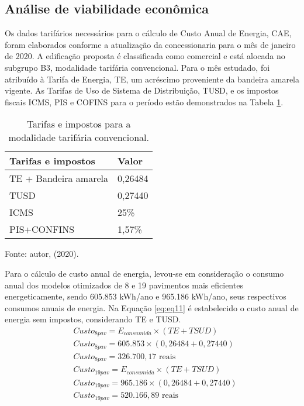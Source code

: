 \subsection{Análise de viabilidade econômica}
\noindent Os dados tarifários necessários para o cálculo de Custo Anual de Energia, CAE, foram elaborados conforme a atualização da concessionaria para o mês de janeiro de 2020. A edificação proposta é classificada como comercial e está alocada no subgrupo B3, modalidade tarifária convencional. Para o mês estudado, foi atribuído à Tarifa de Energia, TE, um acréscimo proveniente da bandeira amarela vigente. As Tarifas de Uso de Sistema de Distribuição, TUSD, e os impostos fiscais ICMS, PIS e COFINS para o período estão demonstrados na Tabela \ref{a}.
\begin{table}[H]
    \centering
    \small
    \caption{Tarifas e impostos para a modalidade tarifária convencional.}
    \begin{tabular}{ll}
    \hline
        \textbf{Tarifas e impostos}     &   \textbf{Valor}  \\\hline
        TE + Bandeira amarela           &   0,26484         \\
        TUSD                            &   0,27440         \\
        ICMS                            &   25\%            \\
        PIS+CONFINS                     &   1,57\%          \\\hline
    \end{tabular}
    \begin{flushleft}
        \par \small Fonte: autor, (2020).
    \end{flushleft}
    \label{a}
\end{table}
\noindent Para o cálculo de custo anual de energia, levou-se em consideração o consumo anual dos modelos otimizados de 8 e 19 pavimentos mais eficientes energeticamente, sendo 605.853 kWh/ano e 965.186 kWh/ano, seus respectivos consumos anuais de energia. Na Equação \ref{eq:eq11} é estabelecido o custo anual de energia sem impostos, considerando TE e TUSD.
\begin{align}\label{eq:eq11}
    &Custo_{8pav}=E_{consumida} \times (TE+TSUD)\nonumber \\
    &Custo_{8pav}=605.853 \times (0,26484+0,27440)\nonumber \\
    &Custo_{8pav}=326.700,17 \text{ reais}\nonumber \\
    &Custo_{19pav}=E_{consumida} \times (TE+TSUD)\nonumber \\
    &Custo_{19pav}=965.186 \times (0,26484+0,27440)\nonumber \\
    &Custo_{19pav}=520.166,89 \text{ reais}
\end{align}
